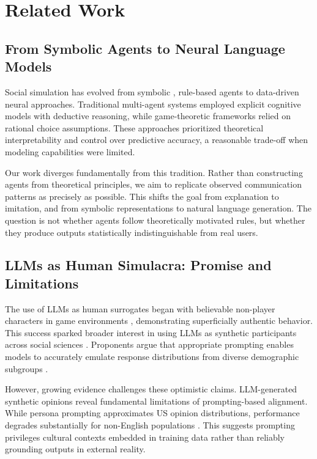 \section{Related Work}

\subsection{From Symbolic Agents to Neural Language Models}
Social simulation has evolved from symbolic \cite{o1998fipa}, rule-based agents to data-driven neural approaches. Traditional multi-agent systems \cite{weiss1999multiagent} employed explicit cognitive models with deductive reasoning, while game-theoretic frameworks relied on rational choice assumptions. These approaches prioritized theoretical interpretability and control over predictive accuracy, a reasonable trade-off when modeling capabilities were limited.

Our work diverges fundamentally from this tradition. Rather than constructing agents from theoretical principles, we aim to replicate observed communication patterns as precisely as possible. This shifts the goal from explanation to imitation, and from symbolic representations to natural language generation. The question is not whether agents follow theoretically motivated rules, but whether they produce outputs statistically indistinguishable from real users.

\subsection{LLMs as Human Simulacra: Promise and Limitations}
The use of LLMs as human surrogates began with believable non-player characters in game environments \cite{park2023generative}, demonstrating superficially authentic behavior. This success sparked broader interest in using LLMs as synthetic participants across social sciences \cite{argyle2023out, chuang2024simulating, papachristou2024network}. Proponents argue that appropriate prompting enables models to accurately emulate response distributions from diverse demographic subgroups \cite{argyle2023out, chang2025llms}.

However, growing evidence challenges these optimistic claims. LLM-generated synthetic opinions reveal fundamental limitations of prompting-based alignment. While persona prompting approximates US opinion distributions, performance degrades substantially for non-English populations \cite{argyle2023out, ma2024algorithmic, munker2025political, munker2025cultural}. This suggests prompting privileges cultural contexts embedded in training data rather than reliably grounding outputs in external reality.

